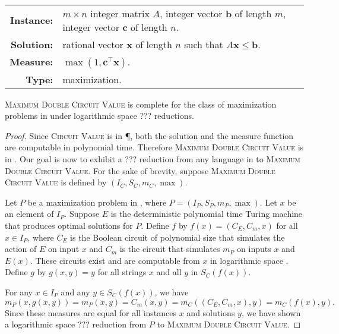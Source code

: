 \documentclass[]{article}
\begin{document}
\begin{definition}
  \mbox{} \\
  \begin{tabular}{r p{9.5cm}}
    \textbf{Instance:} & $m \times n$ integer matrix $A$, integer vector $\mathbf{b}$ of length $m$, integer vector $\mathbf{c}$ of length $n$. \\
    \textbf{Solution:} & rational vector $\mathbf{x}$ of length $n$ such that $A \mathbf{x} \leq \mathbf{b}$. \\
    \textbf{Measure:} & $\max(1, \mathbf{c}^\intercal \mathbf{x})$. \\
    \textbf{Type:} & maximization.
  \end{tabular}
\end{definition}

\begin{theorem}
  \textsc{Maximum Double Circuit Value} is complete for the class of maximization problems in \PO{} under logarithmic space ??? reductions.
\end{theorem}
\begin{proof}
  Since \textsc{Circuit Value} is in \P, both the solution and the measure function are computable in polynomial time.
  Therefore \textsc{Maximum Double Circuit Value} is in \PO.
  Our goal is now to exhibit a ??? reduction from any language in \PO{} to \textsc{Maximum Double Circuit Value}.
  For the sake of brevity, suppose \textsc{Maximum Double Circuit Value} is defined by $(I_C, S_C, m_C, \max)$.

  Let $P$ be a maximization problem in \PO, where $P = (I_P, S_P, m_P, \max)$.
  Let $x$ be an element of $I_P$.
  Suppose $E$ is the deterministic polynomial time Turing machine that produces optimal solutions for $P$.
  Define $f$ by $f(x) = (C_E, C_m, x)$ for all $x \in I_P$, where $C_E$ is the Boolean circuit of polynomial size that simulates the action of $E$ on input $x$ and $C_m$ is the circuit that simulates $m_P$ on inputs $x$ and $E(x)$.
  These circuits exist and are computable from $x$ in logarithmic space \cite{ladner75}.
  Define $g$ by $g(x, y) = y$ for all strings $x$ and all $y$ in $S_C(f(x))$.

  For any $x \in I_P$ and any $y \in S_C(f(x))$, we have
  \begin{equation*}
    m_P(x, g(x, y)) = m_P(x, y) = C_m(x, y) = m_C((C_E, C_m, x), y) = m_C(f(x), y).
  \end{equation*}
  Since these measures are equal for all instances $x$ and solutions $y$, we have shown a logarithmic space ??? reduction from $P$ to \textsc{Maximum Double Circuit Value}.
\end{proof}
\end{document}
